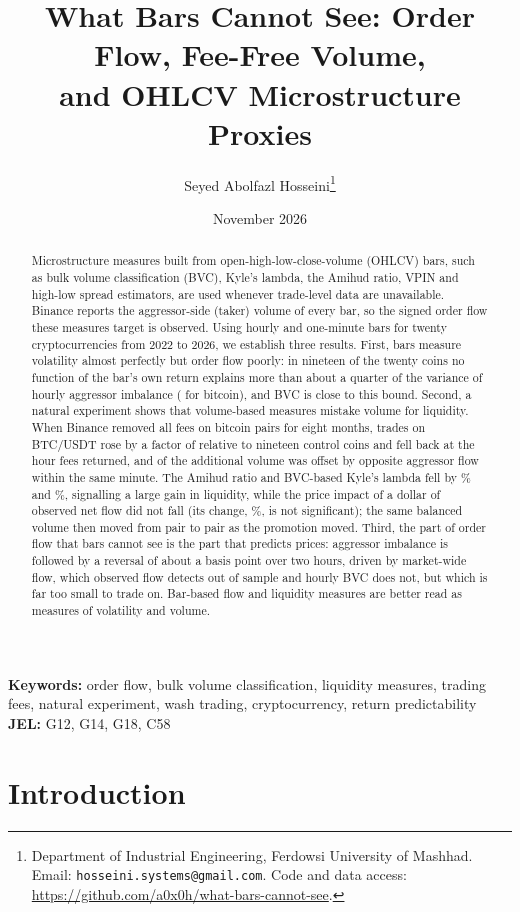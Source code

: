 \documentclass[11pt]{article}
\title{What Bars Cannot See: Order Flow, Fee-Free Volume,\\and OHLCV Microstructure Proxies}
\author{Seyed Abolfazl Hosseini\thanks{Department of Industrial Engineering, Ferdowsi University of Mashhad.
Email: \texttt{hosseini.systems@gmail.com}. Code and data access:
\url{https://github.com/a0x0h/what-bars-cannot-see}.}}
\date{November 2026}
\begin{document}
\maketitle

\begin{abstract}
\noindent Microstructure measures built from open-high-low-close-volume (OHLCV) bars, such as bulk
volume classification (BVC), Kyle's lambda, the Amihud ratio, VPIN and high-low spread estimators,
are used whenever trade-level data are unavailable. Binance reports the aggressor-side (taker) volume
of every bar, so the signed order flow these measures target is observed. Using hourly and one-minute
bars for twenty cryptocurrencies from 2022 to 2026, we establish three results. First, bars measure
volatility almost perfectly but order flow poorly: in nineteen of the twenty coins no function of the
bar's own return explains more than about a quarter of the variance of hourly aggressor imbalance
(\BTCceilIS{} for bitcoin), and BVC is close to this bound. Second, a natural experiment shows that volume-based measures mistake volume for
liquidity. When Binance removed all fees on bitcoin pairs for eight months, trades on BTC/USDT rose by
a factor of \feeOnTradesX{} relative to nineteen control coins and fell back at the hour fees
returned, and \feeExcessTwoShare{} of the additional volume was offset by opposite aggressor flow
within the same minute. The Amihud ratio and BVC-based Kyle's lambda fell by \feeOnAmihudPctA\% and
\feeOnLamBvcPctA\%, signalling a large gain in liquidity, while the price impact of a dollar of
observed net flow did not fall (its change, \feeOnLamTruePct\%, is not significant); the same
balanced volume then moved from pair to pair as the promotion moved. Third, the part of order flow that bars cannot see is the part that
predicts prices: aggressor imbalance is followed by a reversal of about a basis point over two hours,
driven by market-wide flow, which observed flow detects out of sample and hourly BVC does not, but
which is far too small to trade on. Bar-based flow and liquidity measures are better read as measures
of volatility and volume.
\end{abstract}

\noindent\textbf{Keywords:} order flow, bulk volume classification, liquidity measures, trading fees,
natural experiment, wash trading, cryptocurrency, return predictability\\
\textbf{JEL:} G12, G14, G18, C58

\newpage
\section{Introduction}
\end{document}
